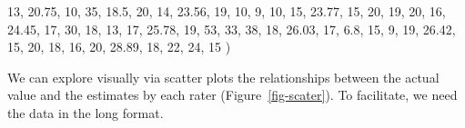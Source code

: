 \documentclass[
  letterpaper,
  DIV=11,
  numbers=noendperiod]{scrreprt}
\newenvironment{Shaded}{\begin{snugshade}}{\end{snugshade}}
\newcommand{\DecValTok}[1]{\textcolor[rgb]{0.68,0.00,0.00}{#1}}
\newcommand{\FloatTok}[1]{\textcolor[rgb]{0.68,0.00,0.00}{#1}}
\newcommand{\NormalTok}[1]{\textcolor[rgb]{0.00,0.23,0.31}{#1}}
\begin{document}
\begin{Shaded}
\begin{Highlighting}[]
\DecValTok{13}\NormalTok{,  }\FloatTok{20.75}\NormalTok{,  }\DecValTok{10}\NormalTok{,  }\DecValTok{35}\NormalTok{, }\FloatTok{18.5}\NormalTok{,  }\DecValTok{20}\NormalTok{,}
\DecValTok{14}\NormalTok{,  }\FloatTok{23.56}\NormalTok{,  }\DecValTok{19}\NormalTok{,  }\DecValTok{10}\NormalTok{,    }\DecValTok{9}\NormalTok{,  }\DecValTok{10}\NormalTok{,}
\DecValTok{15}\NormalTok{,  }\FloatTok{23.77}\NormalTok{,  }\DecValTok{15}\NormalTok{,  }\DecValTok{20}\NormalTok{,   }\DecValTok{19}\NormalTok{,  }\DecValTok{20}\NormalTok{,}
\DecValTok{16}\NormalTok{,  }\FloatTok{24.45}\NormalTok{,  }\DecValTok{17}\NormalTok{,  }\DecValTok{30}\NormalTok{,   }\DecValTok{18}\NormalTok{,  }\DecValTok{13}\NormalTok{,}
\DecValTok{17}\NormalTok{,  }\FloatTok{25.78}\NormalTok{,  }\DecValTok{19}\NormalTok{,  }\DecValTok{53}\NormalTok{,   }\DecValTok{33}\NormalTok{,  }\DecValTok{38}\NormalTok{,}
\DecValTok{18}\NormalTok{,  }\FloatTok{26.03}\NormalTok{,  }\DecValTok{17}\NormalTok{, }\FloatTok{6.8}\NormalTok{,   }\DecValTok{15}\NormalTok{,   }\DecValTok{9}\NormalTok{,}
\DecValTok{19}\NormalTok{,  }\FloatTok{26.42}\NormalTok{,  }\DecValTok{15}\NormalTok{,  }\DecValTok{20}\NormalTok{,   }\DecValTok{18}\NormalTok{,  }\DecValTok{16}\NormalTok{,}
\DecValTok{20}\NormalTok{,  }\FloatTok{28.89}\NormalTok{,  }\DecValTok{18}\NormalTok{,  }\DecValTok{22}\NormalTok{,   }\DecValTok{24}\NormalTok{,  }\DecValTok{15}
\NormalTok{         )}
\end{Highlighting}
\end{Shaded}

We can explore visually via scatter plots the relationships between the
actual value and the estimates by each rater (Figure~\ref{fig-scater}).
To facilitate, we need the data in the long format.
\end{document}

